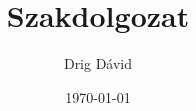 \documentclass{book}
\begin{document}
\title{Szakdolgozat}
\author{Drig Dávid}
\date{\today}

\maketitle
\hulipsum[1]
\lipsum[1]
\end{document}

